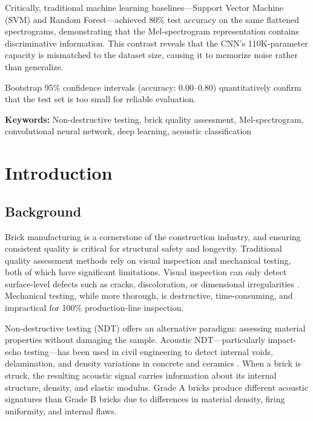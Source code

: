 \documentclass[12pt,a4paper,oneside]{report}
\begin{document}
Critically, traditional machine learning baselines---Support Vector Machine (SVM) and Random Forest---achieved 80\% test accuracy on the same flattened spectrograms, demonstrating that the Mel-spectrogram representation contains discriminative information. This contrast reveals that the CNN's 110K-parameter capacity is mismatched to the dataset size, causing it to memorize noise rather than generalize.

Bootstrap 95\% confidence intervals (accuracy: 0.00--0.80) quantitatively confirm that the test set is too small for reliable evaluation.

\textbf{Keywords:} Non-destructive testing, brick quality assessment, Mel-spectrogram, convolutional neural network, deep learning, acoustic classification

\newpage

\tableofcontents
\newpage

\listoffigures
\newpage

\listoftables
\newpage

\chapter{Introduction}
\label{ch:introduction}

\section{Background}

Brick manufacturing is a cornerstone of the construction industry, and ensuring consistent quality is critical for structural safety and longevity. Traditional quality assessment methods rely on visual inspection and mechanical testing, both of which have significant limitations. Visual inspection can only detect surface-level defects such as cracks, discoloration, or dimensional irregularities \cite{marhoon2015}. Mechanical testing, while more thorough, is destructive, time-consuming, and impractical for 100\% production-line inspection.

Non-destructive testing (NDT) offers an alternative paradigm: assessing material properties without damaging the sample. Acoustic NDT---particularly impact-echo testing---has been used in civil engineering to detect internal voids, delamination, and density variations in concrete and ceramics \cite{rotor2023}. When a brick is struck, the resulting acoustic signal carries information about its internal structure, density, and elastic modulus. Grade A bricks produce different acoustic signatures than Grade B bricks due to differences in material density, firing uniformity, and internal flaws.
\end{document}
